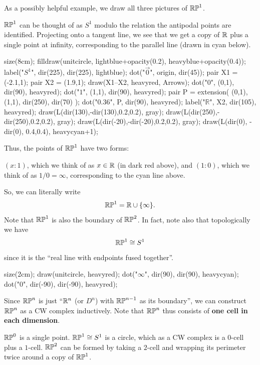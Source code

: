 As a possibly helpful example, we draw all three pictures of $\mathbb{RP}^1$.
\begin{example}
	$\mathbb{RP}^1$ can be thought of as $S^1$ modulo the relation
	the antipodal points are identified.
	Projecting onto a tangent line, we see that we get
	a copy of $\mathbb R$ plus a single point at infinity, corresponding
	to the parallel line (drawn in cyan below).
	\begin{center}
		\begin{asy}
			size(8cm);
			filldraw(unitcircle, lightblue+opacity(0.2), heavyblue+opacity(0.4));
			label("$S^1$", dir(225), dir(225), lightblue);
			dot("$\vec 0$", origin, dir(45));
			pair X1 = (-2.1,1);
			pair X2 = (1.9,1);
			draw(X1--X2, heavyred, Arrows);
			dot("$0$", (0,1), dir(90), heavyred);
			dot("$1$", (1,1), dir(90), heavyred);
			pair P = extension( (0,1), (1,1), dir(250), dir(70) );
			dot("$0.36$", P, dir(90), heavyred);
			label("$\mathbb R$", X2, dir(105), heavyred);
			draw(L(dir(130),-dir(130),0.2,0.2), gray);
			draw(L(dir(250),-dir(250),0.2,0.2), gray);
			draw(L(dir(-20),-dir(-20),0.2,0.2), gray);
			draw(L(dir(0), -dir(0), 0.4,0.4), heavycyan+1);
		\end{asy}
	\end{center}
	Thus, the points of $\mathbb{RP}^1$ have two forms:
	\begin{itemize}
		\ii $(x:1)$, which we think of as $x \in \mathbb R$ (in dark red above), and
		\ii $(1:0)$, which we think of as $1/0 = \infty$,
		corresponding to the cyan line above.
	\end{itemize}
	So, we can literally write
	\[ \mathbb{RP}^1 = \mathbb R \cup \{\infty\}. \]
	Note that $\mathbb{RP}^1$ is also the boundary of $\mathbb{RP}^2$.
	In fact, note also that topologically we have
	\[ \mathbb{RP}^1 \cong S^1 \]
	since it is the ``real line with endpoints fused together''.
	\begin{center}
		\begin{asy}
			size(2cm);
			draw(unitcircle, heavyred);
			dot("$\infty$", dir(90), dir(90), heavycyan);
			dot("$0$", dir(-90), dir(-90), heavyred);
		\end{asy}
	\end{center}
\end{example}

Since $\mathbb{RP}^n$ is just ``$\mathbb R^n$ (or $D^n$) with $\mathbb{RP}^{n-1}$ as its boundary'',
we can construct $\mathbb{RP}^n$ as a CW complex inductively.
Note that $\mathbb{RP}^n$ thus consists of \textbf{one cell in each dimension}.

\begin{example}
	\listhack
	\begin{enumerate}[(a)]
		\ii $\mathbb{RP}^0$ is a single point.
		\ii $\mathbb{RP}^1 \cong S^1$ is a circle, which as a CW complex
		is a $0$-cell plus a $1$-cell.
		\ii $\mathbb{RP}^2$ can be formed by taking a $2$-cell
		and wrapping its perimeter twice around a copy of $\mathbb{RP}^1$.
	\end{enumerate}
\end{example}

